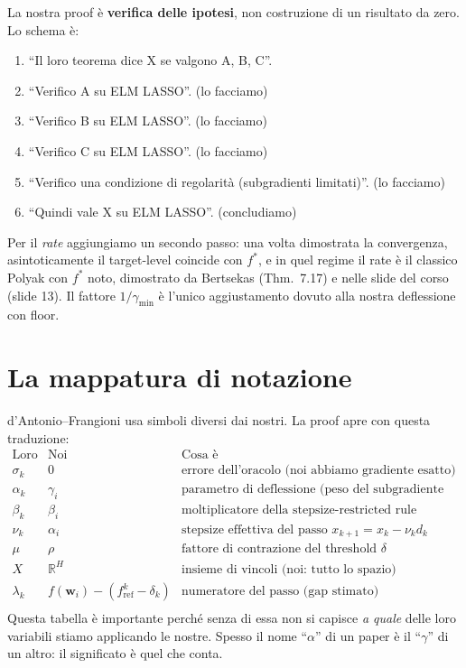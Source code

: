 \documentclass[11pt,a4paper]{article}
\newcommand{\R}{\mathbb{R}}
\newcommand{\bw}{\mathbf{w}}
\theoremstyle{definition}
\begin{document}
\begin{tcolorbox}[intuition]
La nostra proof è \textbf{verifica delle ipotesi}, non costruzione di un risultato da zero. Lo schema è:
\begin{enumerate}[leftmargin=*]
\item ``Il loro teorema dice X se valgono A, B, C''.
\item ``Verifico A su ELM LASSO''. (lo facciamo)
\item ``Verifico B su ELM LASSO''. (lo facciamo)
\item ``Verifico C su ELM LASSO''. (lo facciamo)
\item ``Verifico una condizione di regolarità (subgradienti limitati)''. (lo facciamo)
\item ``Quindi vale X su ELM LASSO''. (concludiamo)
\end{enumerate}
Per il \emph{rate} aggiungiamo un secondo passo: una volta dimostrata la convergenza, asintoticamente il target-level coincide con $f^*$, e in quel regime il rate è il classico Polyak con $f^*$ noto, dimostrato da Bertsekas (Thm.\ 7.17) e nelle slide del corso (slide 13). Il fattore $1/\gamma_{\min}$ è l'unico aggiustamento dovuto alla nostra deflessione con floor.
\end{tcolorbox}

\section{La mappatura di notazione}

d'Antonio--Frangioni usa simboli diversi dai nostri. La proof apre con questa traduzione:
\[
\begin{array}{lll}
\text{Loro} & \text{Noi} & \text{Cosa è}\\
\hline
\sigma_k & 0 & \text{errore dell'oracolo (noi abbiamo gradiente esatto)} \\
\alpha_k & \gamma_i & \text{parametro di deflessione (peso del subgradiente fresco)} \\
\beta_k & \beta_i & \text{moltiplicatore della stepsize-restricted rule} \\
\nu_k & \alpha_i & \text{stepsize effettiva del passo $x_{k+1} = x_k - \nu_k d_k$} \\
\mu & \rho & \text{fattore di contrazione del threshold $\delta$} \\
X & \R^H & \text{insieme di vincoli (noi: tutto lo spazio)} \\
\lambda_k & f(\bw_i) - (f^k_{\mathrm{ref}}-\delta_k) & \text{numeratore del passo (gap stimato)} \\
\end{array}
\]
Questa tabella è importante perché senza di essa non si capisce \emph{a quale} delle loro variabili stiamo applicando le nostre. Spesso il nome ``$\alpha$'' di un paper è il ``$\gamma$'' di un altro: il significato è quel che conta.
\end{document}
